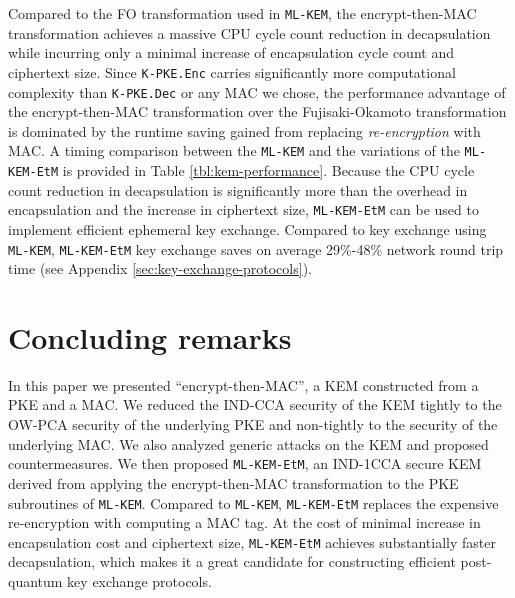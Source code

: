 \documentclass[runningheads]{llncs}
\newcommand{\encrypt}{\texttt{Enc}}
\newcommand{\decrypt}{\texttt{Dec}}
\begin{document}
Compared to the FO transformation used in \texttt{ML-KEM}, the encrypt-then-MAC transformation achieves a massive CPU cycle count reduction in decapsulation while incurring only a minimal increase of encapsulation cycle count and ciphertext size. Since \texttt{K-PKE.\encrypt} carries significantly more computational complexity than \texttt{K-PKE.\decrypt} or any MAC we chose, the performance advantage of the encrypt-then-MAC transformation over the Fujisaki-Okamoto transformation is dominated by the runtime saving gained from replacing \emph{re-encryption} with MAC. A timing comparison between the \texttt{ML-KEM} and the variations of the \texttt{ML-KEM-EtM} is provided in Table \ref{tbl:kem-performance}. Because the CPU cycle count reduction in decapsulation is significantly more than the overhead in encapsulation and the increase in ciphertext size, \texttt{ML-KEM-EtM} can be used to implement efficient ephemeral key exchange. Compared to key exchange using \texttt{ML-KEM}, \texttt{ML-KEM-EtM} key exchange saves on average 29\%-48\% network round trip time (see Appendix \ref{sec:key-exchange-protocols}).

\section{Concluding remarks}\label{sec:conclusion}
In this paper we presented ``encrypt-then-MAC'', a KEM constructed from a PKE and a MAC. We reduced the IND-CCA security of the KEM tightly to the OW-PCA security of the underlying PKE and non-tightly to the security of the underlying MAC. We also analyzed generic attacks on the KEM and proposed countermeasures. We then proposed \texttt{ML-KEM-EtM}, an IND-1CCA secure KEM derived from applying the encrypt-then-MAC transformation to the PKE subroutines of \texttt{ML-KEM}. Compared to \texttt{ML-KEM}, \texttt{ML-KEM-EtM} replaces the expensive re-encryption with computing a MAC tag. At the cost of minimal increase in encapsulation cost and ciphertext size, \texttt{ML-KEM-EtM} achieves substantially faster decapsulation, which makes it a great candidate for constructing efficient post-quantum key exchange protocols.

\end{document}
